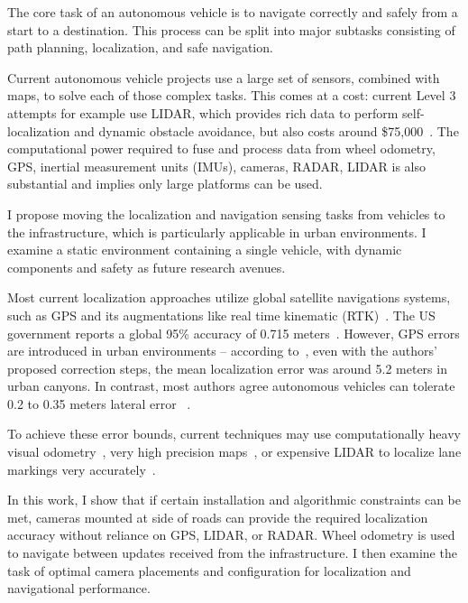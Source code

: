 \documentclass[a4paper,12pt,twoside,openright]{report}
\begin{document}
The core task of an autonomous vehicle is to navigate correctly and safely from a start
to a destination. This process can be split into major subtasks consisting
of path planning, localization, and safe navigation.

Current autonomous vehicle projects use a large set of sensors, combined with
maps, to solve each of those complex tasks. This comes at a cost: current
Level 3 attempts for example use LIDAR, which 
provides rich data to perform self-localization and dynamic obstacle avoidance,
but also costs around \$75,000~\cite{lin2018architectural}. The computational
power required to fuse and process data from wheel odometry,
GPS, inertial measurement units (IMUs), cameras, RADAR, LIDAR is also substantial
and implies only large platforms can be used.

I propose moving the localization and navigation sensing tasks
from vehicles to the infrastructure, which is particularly applicable in urban environments.
I examine a static environment containing a single vehicle, with dynamic components and safety
as future research avenues.

Most current localization approaches utilize global satellite navigations systems,
such as GPS and its augmentations like real time kinematic (RTK)~\cite{scherzinger2000precise}.
The US government reports a global 95\% accuracy of 0.715 meters~\cite{USGPSPerformance}. 
However, GPS errors are introduced in urban environments -- according to~\citeauthor{miura2015gps}, even with the
authors' proposed correction steps, the mean localization error was around 5.2 meters in urban canyons. 
In contrast, most authors agree autonomous vehicles can tolerate 0.2 to 0.35 meters lateral error
~\cite{vivacqua2017low}\cite{ziegler2014video}\cite{mattern2010high}.

To achieve these error bounds, current techniques may use computationally heavy visual odometry~\cite{ziegler2014video},
very high precision maps~\cite{mattern2010high}, or expensive LIDAR to localize
lane markings very accurately~\cite{hata2014road}.  

In this work, I show that if certain installation and algorithmic constraints
can be met, cameras mounted at side of roads can provide the required localization
accuracy without reliance on GPS, LIDAR, or RADAR. Wheel odometry is used to navigate
between updates received from the infrastructure. I then examine the task of 
optimal camera placements and configuration for localization and navigational performance.
\end{document}
